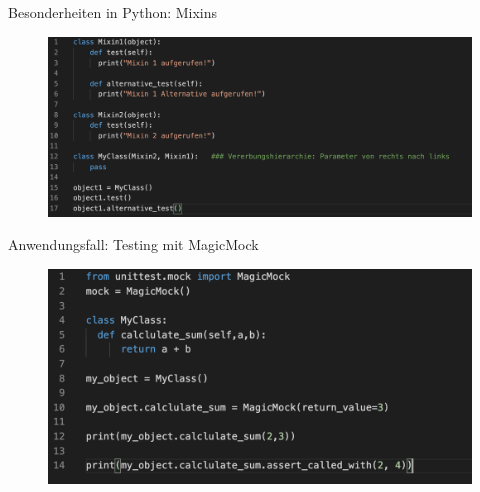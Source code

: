  
\begin{frame}{Besonderheiten in Python: Mixins}
   \begin{figure}[!htb]
        \includegraphics[scale=0.37]{6-python3/img/mixins}  %
    \end{figure}
   
  \end{frame}
       

\begin{frame}{Anwendungsfall: Testing mit MagicMock}
   \begin{figure}[!htb]
        \includegraphics[scale=0.47]{6-python3/img/magicmock}  %
    \end{figure}
   
\end{frame}

